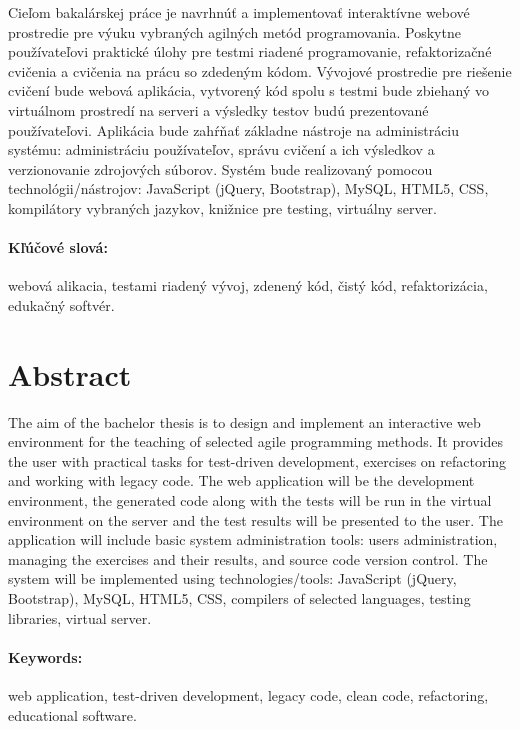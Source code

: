 \documentclass[12pt, oneside]{book}  %
\begin{document}
Cieľom bakalárskej práce je navrhnúť a implementovať interaktívne webové prostredie pre výuku vybraných agilných metód programovania. Poskytne používateľovi praktické úlohy pre testmi riadené programovanie, refaktorizačné cvičenia a cvičenia na prácu so zdedeným kódom. Vývojové prostredie pre riešenie cvičení bude webová aplikácia, vytvorený kód spolu s testmi bude zbiehaný vo virtuálnom prostredí na serveri a výsledky testov budú prezentované používateľovi. Aplikácia bude zahŕňať základne nástroje na administráciu systému: administráciu používateľov, správu cvičení a ich výsledkov a verzionovanie zdrojových súborov. Systém bude realizovaný pomocou technológii/nástrojov: JavaScript (jQuery, Bootstrap), MySQL, HTML5, CSS, kompilátory vybraných jazykov, knižnice pre testing, virtuálny server.

\paragraph*{Kľúčové slová:} webová alikacia, testami riadený vývoj, zdenený kód, čistý kód, refaktorizácia, edukačný softvér.


\newpage 
\section*{Abstract}

The aim of the bachelor thesis is to design and implement an interactive web environment for the teaching of selected agile programming methods. It provides the user with practical tasks for test-driven development, exercises on refactoring and working with legacy code. The web application will be the development environment, the generated code along with the tests will be run in the virtual environment on the server and the test results will be presented to the user. The application will include basic system administration tools: users administration, managing the exercises and their results, and source code version control. The system will be implemented using technologies/tools: JavaScript (jQuery, Bootstrap), MySQL, HTML5, CSS, compilers of selected languages, testing libraries, virtual server.


\paragraph*{Keywords:} web application, test-driven development, legacy code, clean code, refactoring, educational software.
\end{document}
